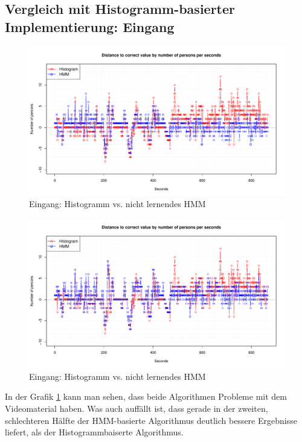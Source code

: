 \subsection{Vergleich mit Histogramm-basierter Implementierung: Eingang}
\label{sec:eval_eingang}
\begin{figure}
	\centering
\includegraphics[width=1\textwidth]{bilder/safest_plot_eingang2_nolearn.pdf}
	\caption{Eingang: Histogramm vs. nicht lernendes HMM}
	\label{fig:Eingang-nolearn}
\end{figure}
\begin{figure}
	\centering
\includegraphics[width=1\textwidth]{bilder/safest_plot_eingang2_learn.pdf}
	\caption{Eingang: Histogramm vs. nicht lernendes HMM}
	\label{fig:Eingang-learn}
\end{figure}
In der Grafik \ref{fig:Eingang-nolearn} kann man sehen, dass beide Algorithmen Probleme mit dem Videomaterial haben. Was auch auffällt ist, dass gerade in der zweiten, schlechteren Hälfte der HMM-basierte Algorithmus deutlich bessere Ergebnisse liefert, als der Histogrammbaiserte Algorithmus.\\


